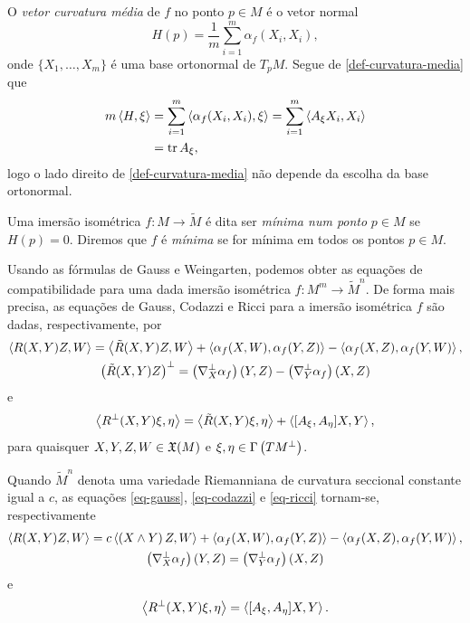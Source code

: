 \begin{definicao}
	O \emph{vetor curvatura média} de $f$ no ponto $p \in M$ é o vetor normal
	\begin{equation}\label{def-curvatura-media}
		H(p) = \frac{1}{m} \sum_{i=1}^{m} \alpha_f (X_i, X_i),
	\end{equation}
	onde $\{ X_1, \ldots, X_m \}$ é uma base ortonormal de $T_p M$. Segue de \eqref{def-curvatura-media} que
	\begin{align*}
		m \left\langle H,\xi \right\rangle &= \sum_{i=1}^{m} \left\langle \alpha_f (X_i, X_i),\xi \right\rangle = \sum_{i=1}^{m} \left\langle A_\xi X_i,X_i \right\rangle\\
		&= \operatorname{tr} A_\xi,
	\end{align*}
	logo o lado direito de \eqref{def-curvatura-media} não depende da escolha da base ortonormal.
\end{definicao}

\begin{definicao}
	Uma imersão isométrica $f: M \rightarrow \tilde{M}$ é dita ser \emph{mínima num ponto} $p \in M$ se $H(p)=0$. Diremos que $f$ é \emph{mínima} se for mínima em todos os pontos $p \in M$.
\end{definicao}

Usando as fórmulas de Gauss e Weingarten, podemos obter as equações de compatibilidade para uma dada imersão isométrica $f: M^m \rightarrow \tilde{M}^n$. De forma mais precisa, as equações de Gauss, Codazzi e Ricci para a imersão isométrica $f$ são dadas, respectivamente, por
\begin{gather}\label{eq-gauss}
	\left\langle R(X,Y)Z,W \right\rangle = \left\langle \tilde{R}(X,Y)Z,W \right\rangle + \left\langle \alpha_f (X,W),\alpha_f(Y,Z) \right\rangle - \left\langle \alpha_f (X,Z),\alpha_f (Y,W) \right\rangle,\\
	\label{eq-codazzi}
	\left( \tilde{R}(X,Y)Z \right)^\perp = \left( \nabla^\perp_X \alpha_f \right)(Y,Z) - \left( \nabla^\perp_Y \alpha_f \right)(X,Z)
\end{gather}
e
\begin{equation}\label{eq-ricci}
	\left\langle R^\perp (X,Y) \xi,\eta \right\rangle = \left\langle \tilde{R}(X,Y) \xi,\eta \right\rangle + \left\langle [A_\xi, A_\eta] X,Y \right\rangle,
\end{equation}
para quaisquer $X,Y,Z,W \in \mathfrak{X}(M)$ e $\xi, \eta \in \Gamma \left( TM^\perp \right)$.

Quando $\tilde{M}^n$ denota uma variedade Riemanniana de curvatura seccional constante igual a $c$, as equações \eqref{eq-gauss}, \eqref{eq-codazzi} e \eqref{eq-ricci} tornam-se, respectivamente
\begin{gather}\label{eq-gauss-em-formas-espaciais}
\left\langle R(X,Y)Z,W \right\rangle = c \left\langle \left( X \wedge Y \right) Z,W \right\rangle + \left\langle \alpha_f (X,W),\alpha_f(Y,Z) \right\rangle - \left\langle \alpha_f (X,Z),\alpha_f (Y,W) \right\rangle,\\
\label{eq-codazzi-em-formas-espaciais}
\left( \nabla^\perp_X \alpha_f \right)(Y,Z) = \left( \nabla^\perp_Y \alpha_f \right)(X,Z)
\end{gather}
e
\begin{equation}\label{eq-ricci-em-formas-espaciais}
\left\langle R^\perp (X,Y) \xi,\eta \right\rangle = \left\langle [A_\xi, A_\eta] X,Y \right\rangle.
\end{equation}

